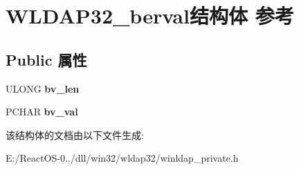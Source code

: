 \hypertarget{struct_w_l_d_a_p32__berval}{}\section{W\+L\+D\+A\+P32\+\_\+berval结构体 参考}
\label{struct_w_l_d_a_p32__berval}
\subsection*{Public 属性}
\begin{DoxyCompactItemize}
\item 
\mbox{\label{struct_w_l_d_a_p32__berval_ab2940ab12ab68980bebe4bfa9e3a1a01}} 
U\+L\+O\+NG {\bfseries bv\+\_\+len}
\item 
\mbox{\label{struct_w_l_d_a_p32__berval_a5ce86fd688bec13e3ef2dc7ceabc1c6f}} 
P\+C\+H\+AR {\bfseries bv\+\_\+val}
\end{DoxyCompactItemize}


该结构体的文档由以下文件生成\+:\begin{DoxyCompactItemize}
\item 
E\+:/\+React\+O\+S-\/0../dll/win32/wldap32/winldap\+\_\+private.\+h\end{DoxyCompactItemize}

